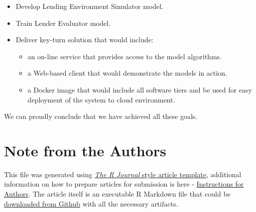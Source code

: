 \begin{itemize}
\tightlist
\item
  Develop Lending Environment Simulator model.
\item
  Train Lender Evaluator model.
\item
  Deliver key-turn solution that would include:

  \begin{itemize}
  \tightlist
  \item
    an on-line service that provides access to the model algorithms.
  \item
    a Web-based client that would demonstrate the models in action.
  \item
    a Docker image that would include all software tiers and be used for
    easy deployment of the system to cloud environment.
  \end{itemize}
\end{itemize}

We can proudly conclude that we have achieved all these goals.



\hypertarget{note-from-the-authors}{%
\section{Note from the Authors}\label{note-from-the-authors}}

This file was generated using
\href{https://github.com/rstudio/rticles}{\emph{The R Journal} style
article template}, additional information on how to prepare articles for
submission is here -
\href{https://journal.r-project.org/share/author-guide.pdf}{Instructions
for Authors}. The article itself is an executable R Markdown file that
could be
\href{https://github.com/ivbsoftware/big-data-final-2/blob/master/docs/R_Journal/big-data-final-2/}{downloaded
from Github} with all the necessary artifacts.


\address{%
Vadim Spirkov\\
York University School of Continuing Studies\\
\\
}


\address{%
Murlidhar Loka\\
York University School of Continuing Studies\\
\\
}


